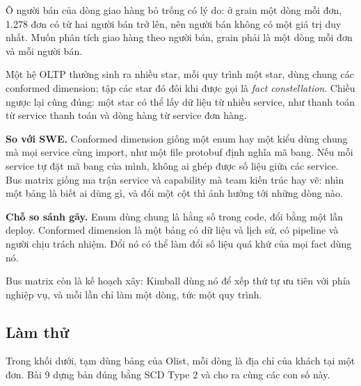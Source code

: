 Ô người bán của dòng giao hàng bỏ trống có lý do: ở grain một dòng mỗi đơn, 1.278 đơn có từ hai người bán trở lên, nên người bán không có một giá trị duy nhất. Muốn phân tích giao hàng theo người bán, grain phải là một dòng mỗi đơn và mỗi người bán.

Một hệ OLTP thường sinh ra nhiều star, mỗi quy trình một star, dùng chung các conformed dimension; tập các star đó đôi khi được gọi là \textit{fact constellation}.
Chiều ngược lại cũng đúng: một star có thể lấy dữ liệu từ nhiều service, như thanh toán từ service thanh toán và dòng hàng từ service đơn hàng.

\begin{ghichu}
\textbf{So với SWE.} Conformed dimension giống một enum hay một kiểu dùng chung mà mọi service cùng import, như một file protobuf định nghĩa mã bang. Nếu mỗi service tự đặt mã bang của mình, không ai ghép được số liệu giữa các service. Bus matrix giống ma trận service và capability mà team kiến trúc hay vẽ: nhìn một bảng là biết ai dùng gì, và đổi một cột thì ảnh hưởng tới những dòng nào.

\textbf{Chỗ so sánh gãy.} Enum dùng chung là hằng số trong code, đổi bằng một lần deploy. Conformed dimension là một bảng có dữ liệu và lịch sử, có pipeline và người chịu trách nhiệm. Đổi nó có thể làm đổi số liệu quá khứ của mọi fact dùng nó.

Bus matrix còn là kế hoạch xây: Kimball dùng nó để xếp thứ tự ưu tiên với phía nghiệp vụ, và mỗi lần chỉ làm một dòng, tức một quy trình.
\end{ghichu}

\subsection{Làm thử}

Trong khối dưới,  tạm dùng bảng  của Olist, mỗi dòng là địa chỉ của khách tại một đơn. Bài 9 dựng bản đúng bằng SCD Type 2 và cho ra cùng các con số này.

